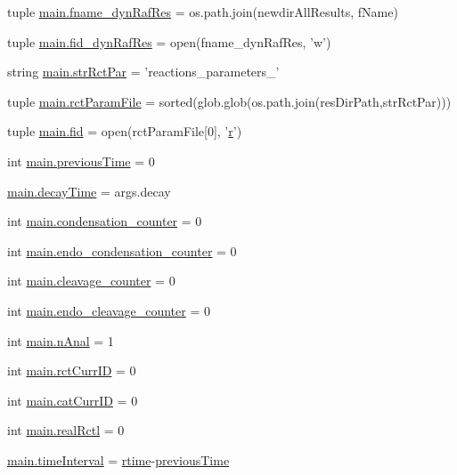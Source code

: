 \begin{DoxyCompactItemize}
\item 
tuple \hyperlink{a00151_a6a031fb0c5a0a5519fc4c3f6d7ef35d1}{main.\-fname\-\_\-dyn\-Raf\-Res} = os.\-path.\-join(newdir\-All\-Results, f\-Name)
\item 
tuple \hyperlink{a00151_aaff6b4fb4c2e2089c2a207a12f1757e3}{main.\-fid\-\_\-dyn\-Raf\-Res} = open(fname\-\_\-dyn\-Raf\-Res, 'w')
\item 
string \hyperlink{a00151_af48af84bff2351a55727aba6a63c1b52}{main.\-str\-Rct\-Par} = 'reactions\-\_\-parameters\-\_\-'
\item 
tuple \hyperlink{a00151_ac4e9cba2fd0b813ba19029541ad609e5}{main.\-rct\-Param\-File} = sorted(glob.\-glob(os.\-path.\-join(res\-Dir\-Path,str\-Rct\-Par)))
\item 
tuple \hyperlink{a00151_a68ab0ffa4b5ff1cceff01f4abe686ad0}{main.\-fid} = open(rct\-Param\-File\mbox{[}0\mbox{]}, '\hyperlink{a00031_ac862e7284527eb913b1351c8bfb8e079}{r}')
\item 
int \hyperlink{a00151_a6a6de947e3b6ada5ea6e761d208228bd}{main.\-previous\-Time} = 0
\item 
\hyperlink{a00151_a5517c07ae046c271d6291e9b3f7d139d}{main.\-decay\-Time} = args.\-decay
\item 
int \hyperlink{a00151_a358b60986e7e25df0dfb61562b7aa3e2}{main.\-condensation\-\_\-counter} = 0
\item 
int \hyperlink{a00151_a0521d81d319c4d79433b5fb65a6da1c2}{main.\-endo\-\_\-condensation\-\_\-counter} = 0
\item 
int \hyperlink{a00151_aba28788973ae3e9140b53078efe5d204}{main.\-cleavage\-\_\-counter} = 0
\item 
int \hyperlink{a00151_a17b22b48a2afe0223186b4275fe5ba70}{main.\-endo\-\_\-cleavage\-\_\-counter} = 0
\item 
int \hyperlink{a00151_ae7ca1c378927da05feb71e5a9f775afb}{main.\-n\-Anal} = 1
\item 
int \hyperlink{a00151_a53e397dea15f17442a198395e65b377b}{main.\-rct\-Curr\-I\-D} = 0
\item 
int \hyperlink{a00151_aa56c55225fa65fa569bd8d5f1063550e}{main.\-cat\-Curr\-I\-D} = 0
\item 
int \hyperlink{a00151_a2dcb93d1b24fce96491e031528ed43c0}{main.\-real\-Rctl} = 0
\item 
\hyperlink{a00151_a5ba0cd0b7538ed8047b2fea322ecb4b7}{main.\-time\-Interval} = \hyperlink{a00028_afc6b38657a313b9f1de2ee356910b6ee}{rtime}-\/\hyperlink{a00028_a17b8652a085b5add031a40fb1c9a680e}{previous\-Time}
\item 

\end{DoxyCompactItemize}
